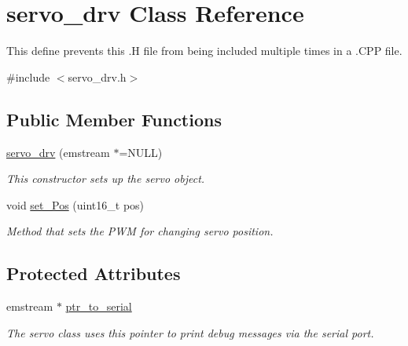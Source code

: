 \hypertarget{classservo__drv}{\section{servo\-\_\-drv Class Reference}
\label{classservo__drv}
}


This define prevents this .H file from being included multiple times in a .C\-P\-P file.  




{\ttfamily \#include $<$servo\-\_\-drv.\-h$>$}

\subsection*{Public Member Functions}
\begin{DoxyCompactItemize}
\item 
\hyperlink{classservo__drv_af67b71c2466b067b96846d27c4ac45c8}{servo\-\_\-drv} (emstream $\ast$=N\-U\-L\-L)
\begin{DoxyCompactList}\small\item\em This constructor sets up the servo object. \end{DoxyCompactList}\item 
void \hyperlink{classservo__drv_a7069cb1caa934b4a0dd4f76df883d319}{set\-\_\-\-Pos} (uint16\-\_\-t pos)
\begin{DoxyCompactList}\small\item\em Method that sets the P\-W\-M for changing servo position. \end{DoxyCompactList}\end{DoxyCompactItemize}
\subsection*{Protected Attributes}
\begin{DoxyCompactItemize}
\item 
\hypertarget{classservo__drv_a1b4103f2487666884b4aa8eb80c5dff0}{emstream $\ast$ \hyperlink{classservo__drv_a1b4103f2487666884b4aa8eb80c5dff0}{ptr\-\_\-to\-\_\-serial}}\label{classservo__drv_a1b4103f2487666884b4aa8eb80c5dff0}

\begin{DoxyCompactList}\small\item\em The servo class uses this pointer to print debug messages via the serial port. \end{DoxyCompactList}\end{DoxyCompactItemize}


